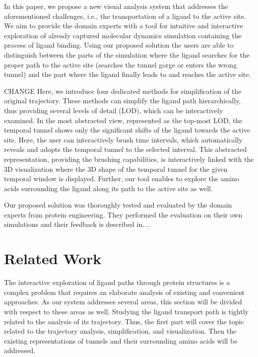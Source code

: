 \documentclass[twocolumn]{bmcart}%
\begin{document}
In this paper, we propose a new visual analysis system that addresses the aforementioned challenges, i.e.,  the transportation of a ligand to the active site. 
We aim to provide the domain experts with a tool for intuitive and interactive exploration of already captured molecular dynamics simulation containing the process of ligand binding. 
Using our proposed solution the users are able to distinguish between the parts of the simulation where the ligand searches for the proper path to the active site (searches the tunnel gorge or enters the wrong tunnel) and the part where the ligand finally leads to and reaches the active site.

{\color{red} CHANGE
Here, we introduce four dedicated methods for simplification of the original trajectory.
These methods can simplify the ligand path hierarchically, thus providing several levels of detail (LOD), which can be interactively examined.
In the most abstracted view, represented as the top-most LOD, the temporal tunnel shows only the significant shifts of the ligand towards the active site. 
Here, the user can interactively brush time intervals, which automatically reveals and adopts the temporal tunnel to the selected interval.
This abstracted representation, providing the brushing capabilities, is interactively linked with the 3D visualization where the 3D shape of the temporal tunnel for the given temporal window is displayed.
Further, our tool enables to explore the amino acids surrounding the ligand along its path to the active site as well.

Our proposed solution was thoroughly tested and evaluated by the domain experts from protein engineering.
They performed the evaluation on their own simulations and their feedback is described in....}

\section{Related Work}
The interactive exploration of ligand paths through protein structures is a complex problem that requires an elaborate analysis of existing and convenient approaches.
As our system addresses several areas, this section will be divided with respect to these areas as well. 
Studying the ligand transport path is tightly related to the analysis of its trajectory.
Thus, the first part will cover the topic related to the trajectory analysis, simplification, and visualization.
Then the existing representations of tunnels and their surrounding amino acids will be addressed.
\end{document}
